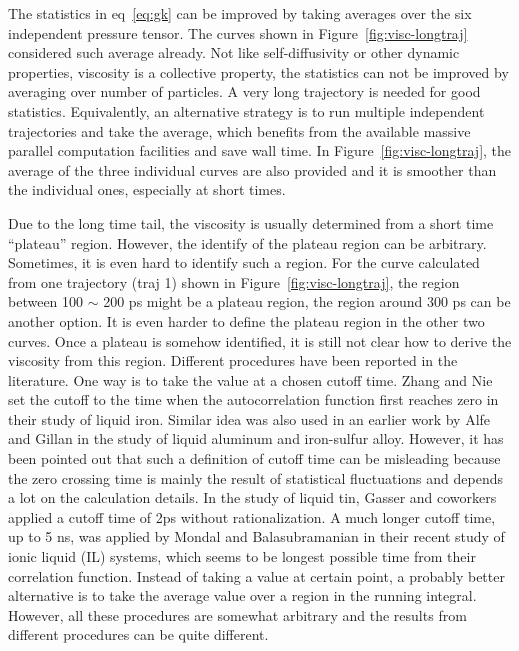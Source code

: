 \documentclass[12pt]{article}
\begin{document}
The statistics in eq~\ref{eq:gk} can be improved by taking averages over the six independent pressure tensor.
\cite{Evans.JCP.100.541.1994,
Hess.JCP.116.209.2002}
The curves shown in Figure~\ref{fig:visc-longtraj} considered such average already.
Not like self-diffusivity or other dynamic properties,
viscosity is a collective property,
the statistics can not be improved by averaging over number of particles.
A very long trajectory is needed for good statistics.
Equivalently, an alternative strategy is to run multiple independent trajectories and take the average,
\cite{Gasser.JCP.136.094501.2012,
Bala.JCED.59.3061.2014}
which benefits from the available massive parallel computation facilities and save wall time.
In Figure~\ref{fig:visc-longtraj},
the average of the three individual curves are also provided
and it is smoother than the individual ones,
especially at short times.

Due to the long time tail,
the viscosity is usually determined from a short time ``plateau'' region.
However, the identify of the plateau region can be arbitrary.
Sometimes, it is even hard to identify such a region.
For the curve calculated from one trajectory (traj 1) shown in Figure~\ref{fig:visc-longtraj},
the region between 100 $\sim$  200 ps might be a plateau region,
the region around 300 ps can be another option.
It is even harder to define the plateau region in the other two curves.
Once a plateau is somehow identified,
it is still  not clear how to derive the viscosity from this region.
Different procedures have been reported in the literature.
One way is to take the value at a chosen cutoff time.
Zhang and Nie \cite{Nie.PCM.27.164.2000} set the cutoff to the time when the autocorrelation function first reaches zero 
in their study of liquid iron. 
Similar idea was also used in an earlier work by Alfe and Gillan \cite{Alfe.PRL.81.5161.1998}
in the study of liquid aluminum and iron-sulfur alloy.
However, it has been pointed out that such a definition of cutoff time can be misleading 
because the zero crossing time is mainly the result of statistical fluctuations
and depends a lot on the calculation details.
\cite{Gasser.JCP.136.094501.2012}
In the study of liquid tin,
Gasser and coworkers applied a cutoff time of 2ps without rationalization.
A much longer cutoff time, up to 5 ns, was applied by Mondal and Balasubramanian in their recent study of ionic liquid (IL) systems,
\cite{Bala.JCED.59.3061.2014}
which seems to be longest possible time from their correlation function.
Instead of taking a value at certain point, 
a probably better alternative is to take the average value over a region in the running integral.
\cite{Smit.JCP.131.246101.2009,
Kazandjian.PRE.85.066701.2012}
However, all these procedures are somewhat arbitrary and
the results from different procedures can be quite different.
\end{document}
